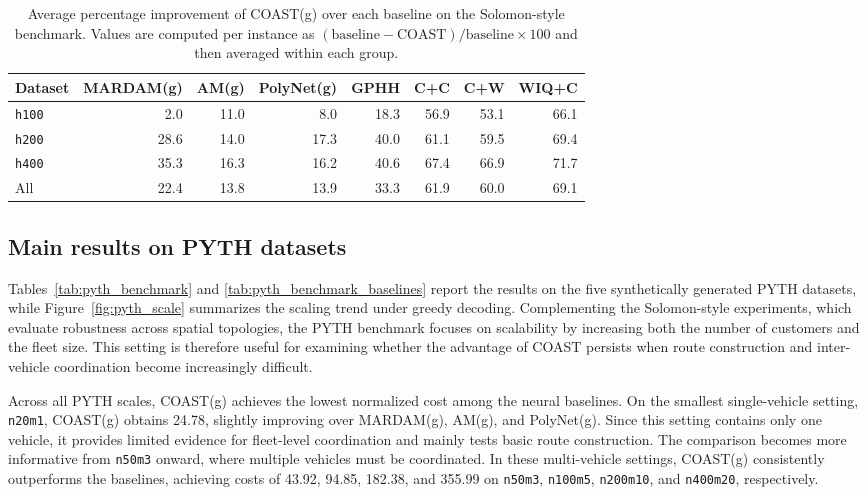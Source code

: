 \documentclass[letterpaper]{article}
\begin{document}
\begin{table}[t]
\centering
{\small
\setlength{\tabcolsep}{2pt}
\begin{tabular}{lrrrrrrr}
\toprule
Dataset & MARDAM(g) & AM(g) & PolyNet(g) & GPHH & C+C & C+W & WIQ+C \\
\midrule
\texttt{h100} & 2.0 & 11.0 & 8.0 & 18.3 & 56.9 & 53.1 & 66.1 \\
\texttt{h200} & 28.6 & 14.0 & 17.3 & 40.0 & 61.1 & 59.5 & 69.4 \\
\texttt{h400} & 35.3 & 16.3 & 16.2 & 40.6 & 67.4 & 66.9 & 71.7 \\
All & 22.4 & 13.8 & 13.9 & 33.3 & 61.9 & 60.0 & 69.1 \\
\bottomrule
\end{tabular}
}
\caption{Average percentage improvement of COAST(g) over each baseline on the Solomon-style benchmark. Values are computed per instance as $(\mathrm{baseline}-\mathrm{COAST})/\mathrm{baseline}\times 100$ and then averaged within each group.}
\label{tab:solomon_improvement}
\end{table}


\subsection{Main results on PYTH datasets}

Tables~\ref{tab:pyth_benchmark} and \ref{tab:pyth_benchmark_baselines} report the results on the five synthetically generated PYTH datasets, while Figure~\ref{fig:pyth_scale} summarizes the scaling trend under greedy decoding. Complementing the Solomon-style experiments, which evaluate robustness across spatial topologies, the PYTH benchmark focuses on scalability by increasing both the number of customers and the fleet size. This setting is therefore useful for examining whether the advantage of COAST persists when route construction and inter-vehicle coordination become increasingly difficult.

Across all PYTH scales, COAST(g) achieves the lowest normalized cost among the neural baselines. On the smallest single-vehicle setting, \texttt{n20m1}, COAST(g) obtains 24.78, slightly improving over MARDAM(g), AM(g), and PolyNet(g). Since this setting contains only one vehicle, it provides limited evidence for fleet-level coordination and mainly tests basic route construction. The comparison becomes more informative from \texttt{n50m3} onward, where multiple vehicles must be coordinated. In these multi-vehicle settings, COAST(g) consistently outperforms the baselines, achieving costs of 43.92, 94.85, 182.38, and 355.99 on \texttt{n50m3}, \texttt{n100m5}, \texttt{n200m10}, and \texttt{n400m20}, respectively.
\end{document}
